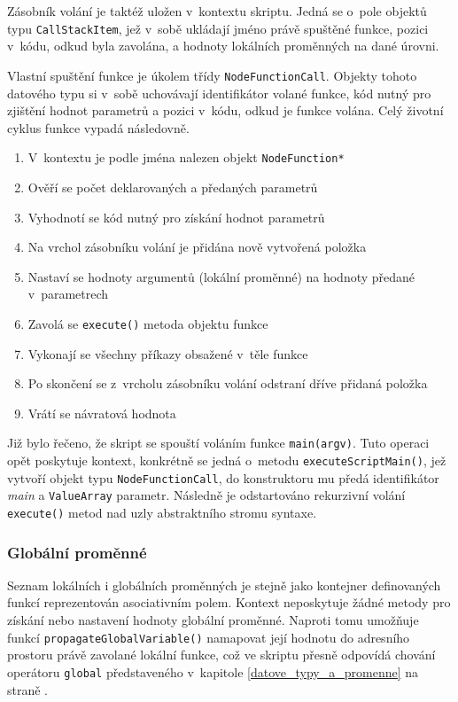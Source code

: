 \documentclass[11pt,twoside,a4paper]{book}
\begin{document}
Zásobník volání je taktéž uložen v~kontextu skriptu. Jedná se o~pole objektů typu \texttt{Call\-Stack\-Item}, jež v~sobě ukládají jméno právě spuštěné funkce, pozici v~kódu, odkud byla zavolána, a hodnoty lokálních proměnných na dané úrovni.

Vlastní spuštění funkce je úkolem třídy \texttt{NodeFunctionCall}. Objekty tohoto datového typu si v~sobě uchovávají identifikátor volané funkce, kód nutný pro zjištění hodnot parametrů a pozici v~kódu, odkud je funkce volána. Celý životní cyklus funkce vypadá následovně.

\begin{enumerate}
\item V~kontextu je podle jména nalezen objekt \texttt{NodeFunction*}
\item Ověří se počet deklarovaných a předaných parametrů
\item Vyhodnotí se kód nutný pro získání hodnot parametrů
\item Na vrchol zásobníku volání je přidána nově vytvořená položka
\item Nastaví se hodnoty argumentů (lokální proměnné) na hodnoty předané v~parametrech
\item Zavolá se \texttt{execute()} metoda objektu funkce
\item Vykonají se všechny příkazy obsažené v~těle funkce
\item Po skončení se z~vrcholu zásobníku volání odstraní dříve přidaná položka
\item Vrátí se návratová hodnota
\end{enumerate}

Již bylo řečeno, že skript se spouští voláním funkce \texttt{main(argv)}. Tuto operaci opět poskytuje kontext, konkrétně se jedná o~metodu \texttt{executeScriptMain()}, jež vytvoří objekt typu \texttt{NodeFunctionCall}, do konstruktoru mu předá identifikátor \textit{main} a \texttt{ValueArray} parametr. Následně je odstartováno rekurzivní volání \texttt{execute()} metod nad uzly abstraktního stromu syntaxe.


\subsubsection{Globální proměnné}

Seznam lokálních i globálních proměnných je stejně jako kontejner definovaných funkcí reprezentován asociativním polem. Kontext neposkytuje žádné metody pro získání nebo nastavení hodnoty globální proměnné. Naproti tomu umožňuje funkcí \texttt{propagateGlobalVariable()} namapovat její hodnotu do adresního prostoru právě zavolané lokální funkce, což ve skriptu přesně odpovídá chování operátoru \texttt{global} představeného v~kapitole \ref{datove_typy_a_promenne} na straně \pageref{datove_typy_a_promenne}.
\end{document}
